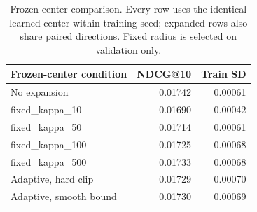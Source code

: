 \begin{table}[t]
\centering\small
\begin{tabular}{lrr}
\toprule
Frozen-center condition & NDCG@10 & Train SD\\
\midrule
No expansion & 0.01742 & 0.00061\\
fixed\_kappa\_10 & 0.01690 & 0.00042\\
fixed\_kappa\_50 & 0.01714 & 0.00061\\
fixed\_kappa\_100 & 0.01725 & 0.00068\\
fixed\_kappa\_500 & 0.01733 & 0.00068\\
Adaptive, hard clip & 0.01729 & 0.00070\\
Adaptive, smooth bound & 0.01730 & 0.00069\\
\bottomrule
\end{tabular}
\caption{Frozen-center comparison. Every row uses the identical learned center within training seed; expanded rows also share paired directions. Fixed radius is selected on validation only.}
\label{tab:frozen-center-radius}
\end{table}
